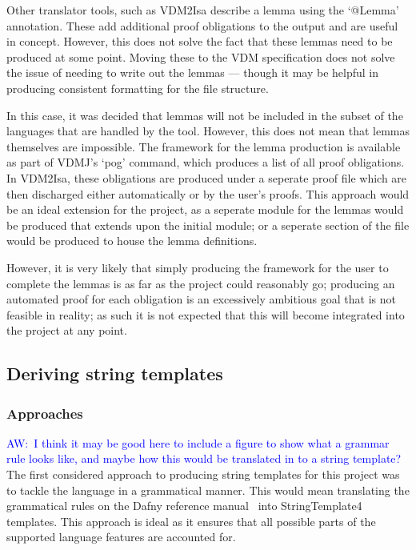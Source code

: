 \documentclass{entcs}
\newcommand{\awcomment}[1]{\ifthenelse { \boolean{showComments} } {\textcolor{blue}{AW:~#1}} { } } %
\begin{document}
Other translator tools, such as VDM2Isa describe a lemma using the `@Lemma' annotation. These add additional proof obligations to the output and are useful in concept. However, this does not solve the fact that these lemmas need to be produced at some point. Moving these to the VDM specification does not solve the issue of needing to write out the lemmas --- though it may be helpful in producing consistent formatting for the file structure.

In this case, it was decided that lemmas will not be included in the subset of the languages that are handled by the tool. However, this does not mean that lemmas themselves are impossible. The framework for the lemma production is available as part of VDMJ's `pog' command, which produces a list of all proof obligations. In VDM2Isa, these obligations are produced under a seperate proof file which are then discharged either automatically or by the user's proofs. This approach would be an ideal extension for the project, as a seperate module for the lemmas would be produced that extends upon the initial module; or a seperate section of the file would be produced to house the lemma definitions.

However, it is very likely that simply producing the framework for the user to complete the lemmas is as far as the project could reasonably go; producing an automated proof for each obligation is an excessively ambitious goal that is not feasible in reality; as such it is not expected that this will become integrated into the project at any point.

\subsection{Deriving string templates}

\subsubsection{Approaches}

\awcomment{I think it may be good here to include a figure to show what a grammar rule looks like, and maybe how this would be translated in to a string template?}
The first considered approach to producing string templates for this project was to tackle the language in a grammatical manner. This would mean translating the grammatical rules on the Dafny reference manual~\cite{DfyGrammar} into StringTemplate4 templates. This approach is ideal as it ensures that all possible parts of the supported language features are accounted for. 
\end{document}
